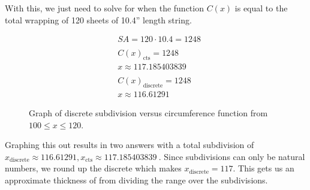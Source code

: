 \begin{solution}
With this, we just need to solve for when the function $C(x)$ is equal to 
the total wrapping of 120 sheets of 10.4” length string.

\newpage

\begin{figure}[h]
    \centering
    \begin{minipage}[h]{0.48\textwidth}
        \vspace{0pt}
        \caption{Graph of discrete subdivision versus circumference function from $100 \leq x \leq 120$.}
    \end{minipage}
    \hfill
    \begin{minipage}[h]{0.48\textwidth}
        \vspace{0pt}
        \centering
        \begin{align*}
            & SA = 120 \cdot 10.4 = 1248 \\\\
            & C(x)_{\text{cts}} = 1248 \\
            & x \approx 117.185403839 \\\\
            & C(x)_{\text{discrete}} = 1248 \\
            & x \approx 116.61291
        \end{align*}
    \end{minipage}
\end{figure}

Graphing this out results in two answers with a total subdivision of $x_{\text{discrete}} \approx 116.61291, x_{\text{cts}} \approx 117.185403839 \ $. 
Since subdivisions can only be natural numbers, we round up the discrete which makes $x_{\text{discrete}} = 117$. This gets us an approximate thickness of
from dividing the range over the subdivisions.


\end{solution}
